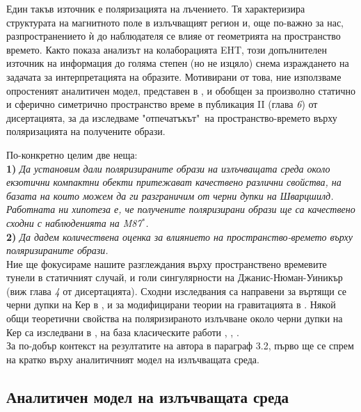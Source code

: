 \documentclass[12pt]{article}
\numberwithin{equation}{section}
\numberwithin{figure}{section}
\begin{document}
	Един такъв източник е поляризацията на лъчението. Тя характеризира структурата на магнитното поле в излъчващият регион и, още по-важно за нас, разпространението ѝ до наблюдателя се влияе от геометрията на пространство времето. Както показа анализът на колаборацията EHT, този допълнителен източник на информация до голяма степен (но не изцяло) снема израждането на задачата за интерпретацията на образите. Мотивирани от това, ние използваме опростеният аналитичен модел, представен в \cite{Narayan2021}, и обобщен за произволно статично и сферично симетрично пространство време в публикация II (глава \emph{6}) от дисертацията, за да изследваме "отпечатъкът"$\,$ на пространство-времето върху поляризацията на получените образи.\newpage
	
	По-конкретно целим две неща: \\
	
	\textbf{1)} \emph{Да установим дали поляризираните образи на излъчващата среда около екзотични компактни обекти притежават качествено различни свойства, на базата на които можем да ги разграничим от черни дупки на Шварцшилд. Работната ни хипотеза е, че получените поляризирани образи ще са качествено сходни с наблюденията на M87$^*$.}\\
	
	\textbf{2)} \emph{Да дадем количествена оценка за влиянието на пространство-времето върху поляризираните образи.}\\
	
	Ние ще фокусираме нашите разглеждания върху пространствено времевите тунели в статичният случай, и голи сингулярности на Джанис-Нюман-Уиникър (виж глава \emph{4} от дисертацията). Сходни изследвания са направени за въртящи се черни дупки на Кер в \cite{Gelles2021}, и за модифицирани теории на гравитацията в \cite{Qin2021}. Някой общи теоретични свойства на поляризираното излъчване около черни дупки на Кер са изследвани в \cite{Himwich2020}, на база класическите работи \cite{Luminet1979}, \cite{Connors1980}, \cite{Chen1991}.\\
	
	За по-добър контекст на резултатите на автора в параграф 3.2, първо ще се спрем на кратко върху аналитичният модел на излъчващата среда.

	\subsection{Аналитичен модел на излъчващата среда}
	
	
	
\end{document}
